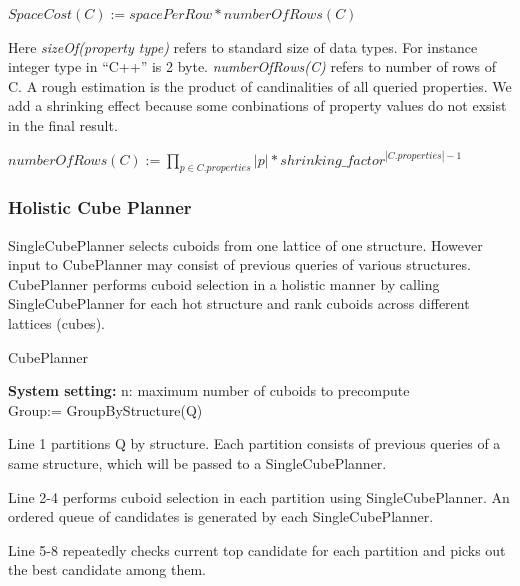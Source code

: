 $SpaceCost(C):= spacePerRow *  numberOfRows(C)$
 
Here \textit{sizeOf(property type)} refers to standard size of data types. For instance integer type in ``C++'' is 2 byte. \textit{numberOfRows(C)} refers to number of rows of C. A rough estimation is the product of candinalities of all queried properties.  We add a shrinking effect because some conbinations of property values do not exsist in the final result. 
 
$numberOfRows(C):= \displaystyle{\prod_{p\in C.properties}|p|} * shrinking\_factor^{|C.properties|-1}$

\subsubsection{Holistic Cube Planner}

SingleCubePlanner selects cuboids from one lattice of one structure. However input to CubePlanner may consist of previous queries of various structures. CubePlanner performs cuboid selection in a holistic manner by calling SingleCubePlanner for each hot structure and rank cuboids across different lattices (cubes). 

\begin{algorithm}[H]
	\caption{CubePlanner}
	\LinesNumbered 
	\textbf{System setting:} n: maximum number of cuboids to precompute\\ 
	Group:= GroupByStructure(Q) \;
	
	
\end{algorithm}
\clearpage

Line 1 partitions Q by structure. Each partition consists of previous queries of a same structure, which will be passed to a SingleCubePlanner.

Line 2-4 performs cuboid selection in each partition using SingleCubePlanner. An ordered queue of candidates is generated by each SingleCubePlanner.

Line 5-8 repeatedly checks current top candidate for each partition and picks out the best candidate among them.   

